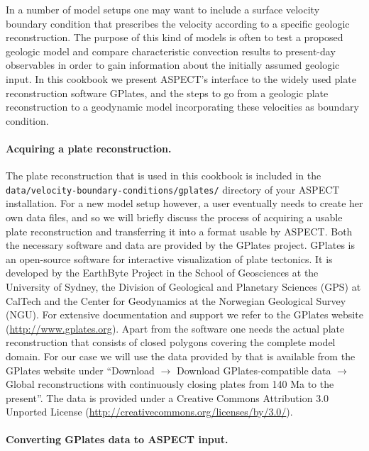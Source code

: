 \documentclass{article}
\newcommand{\aspect}{\textsc{ASPECT}}
\begin{document}
In a number of model setups one may want to include a surface velocity boundary
condition that prescribes the velocity according to a specific geologic
reconstruction. The purpose of this kind of models is often to test a proposed
geologic model and compare characteristic convection results to present-day
observables in order to gain information about the initially assumed geologic
input. In this cookbook we present \aspect{}'s interface to the  widely used
plate reconstruction software GPlates, and the steps to go from a geologic plate
reconstruction to a geodynamic model incorporating these velocities as boundary
condition.

\paragraph{Acquiring a plate reconstruction.}

The plate reconstruction that is used in this cookbook is included in
the \texttt{data/velocity-boundary-conditions/gplates/} directory of
your \aspect{} installation.
For a new model setup however, a user eventually needs to create her own data
files, and so we will briefly discuss the process of acquiring a usable plate
reconstruction and transferring it into a format usable by \aspect{}.
Both the necessary software and data are provided by the GPlates project.
GPlates is an open-source software for interactive visualization of plate
tectonics. It is developed by the EarthByte Project in the School of Geosciences
at the University of Sydney, the Division of Geological and Planetary Sciences
(GPS) at CalTech and the Center for Geodynamics at the Norwegian Geological
Survey (NGU). For extensive documentation and support we refer to the GPlates
website (\url{http://www.gplates.org}). Apart from the software one needs the
actual plate reconstruction that consists of closed polygons covering the
complete model domain. For our case we will use the data provided by
\cite{GTZDSMBSMB12} that is available from the GPlates website under ``Download
$\rightarrow$ Download GPlates-compatible data $\rightarrow$ Global
reconstructions with continuously closing plates from 140 Ma to the present''.
The data is provided under a Creative Commons Attribution 3.0 Unported License
(\url{http://creativecommons.org/licenses/by/3.0/}).

\paragraph{Converting GPlates data to \aspect{} input.}
\end{document}
